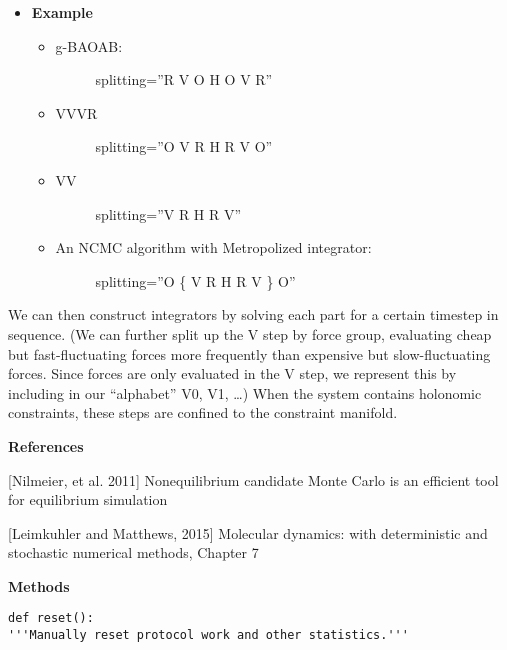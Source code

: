 \begin{description}
\begin{description}
\begin{itemize}
\begin{description}
  \begin{itemize}
  \item
    a = e\^{}(-gamma dt)
  \item
    b = sqrt(1 - e\^{}(-2gamma dt))
  \item
    R is i.i.d. standard normal
  \end{itemize}
  \end{description}
  \item
    \textbf{Example}
  \begin{itemize}
    \item
      \begin{description}
      \item[g-BAOAB:]
      splitting=''R V O H O V R''
      \end{description}
    \item
      \begin{description}
      \item[VVVR]
      splitting=''O V R H R V O''
      \end{description}
    \item
      \begin{description}
      \item[VV]
      splitting=''V R H R V''
      \end{description}
    \item
      \begin{description}
      \item[An NCMC algorithm with Metropolized integrator:]
      splitting=''O \{ V R H R V \} O''
      \end{description}
    \end{itemize}
\end{itemize}

We can then construct integrators by solving each part for a certain
timestep in sequence. (We can further split up the V step by force
group, evaluating cheap but fast-fluctuating forces more frequently than
expensive but slow-fluctuating forces. Since forces are only evaluated
in the V step, we represent this by including in our ``alphabet'' V0,
V1, \ldots) When the system contains holonomic constraints, these steps
are confined to the constraint manifold.
\end{description}

\textbf{References}

{[}Nilmeier, et al. 2011{]} Nonequilibrium candidate Monte Carlo is an
efficient tool for equilibrium simulation

{[}Leimkuhler and Matthews, 2015{]} Molecular dynamics: with
deterministic and stochastic numerical methods, Chapter 7

\begin{description}
\item
    \textbf{Methods}
\begin{verbatim}
def reset():
'''Manually reset protocol work and other statistics.'''
\end{verbatim}
\end{description}
\end{description}


